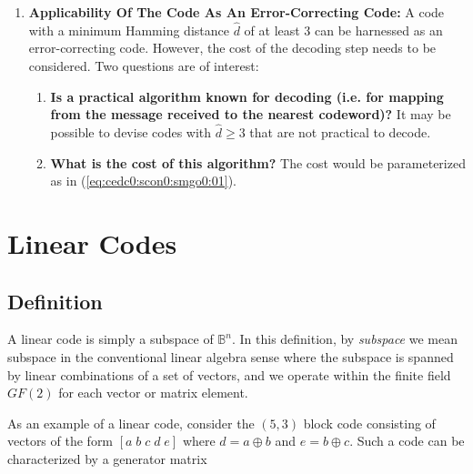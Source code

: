 \begin{enumerate}
\item \label{enum:cedc0:scon0:smgo0:01:04}
      \textbf{Applicability Of The Code As An Error-Correcting Code:}
      A code with a minimum Hamming distance $\hat{d}$ of at least 3 can be harnessed as
      an error-correcting code.  However, the cost of the decoding step needs to be
      considered.  Two questions are of interest:

      \begin{enumerate}
      \item \textbf{Is a practical algorithm known for decoding (i.e. for mapping from the 
            message received to the nearest codeword)?}  It may be possible to devise codes
            with $\hat{d} \geq 3$ that are not practical to decode.
      \item \textbf{What is the cost of this algorithm?}  The cost would be parameterized
            as in (\ref{eq:cedc0:scon0:smgo0:01}).
      \end{enumerate}
\end{enumerate}


\section{Linear Codes}
\label{cedc0:slco0}


\subsection{Definition}
\label{cedc0:slco0:sdef0}

A linear code is simply a subspace of $\mathbb{B}^n$.  In this definition, 
by \emph{subspace} we mean subspace in the conventional linear algebra
sense where the subspace is spanned by linear combinations of a set of vectors,
and we operate within the finite field $GF(2)$ for each vector or matrix element.

As an example of a linear code, consider the $(5,3)$ block code consisting 
of vectors of the form $[a\;b\;c\;d\;e]$ where $d = a \oplus b$ and
$e = b \oplus c$.  Such a code can be characterized by a generator
matrix 

